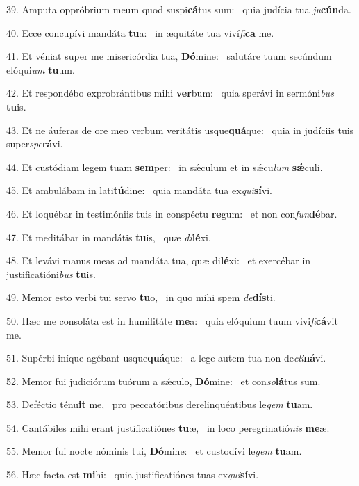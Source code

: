 39. Amputa oppróbrium meum quod suspi\textbf{cá}tus sum: \ast\  quia judícia tua \textit{ju}\textbf{cún}da.\

40. Ecce concupívi mandáta \textbf{tu}a: \ast\  in æquitáte tua viví\textit{fi}\textbf{ca} me.\

41. Et véniat super me misericórdia tua, \textbf{Dó}mine: \ast\  salutáre tuum secúndum elóqui\textit{um} \textbf{tu}um.\

42. Et respondébo exprobrántibus mihi \textbf{ver}bum: \ast\  quia sperávi in sermóni\textit{bus} \textbf{tu}is.\

43. Et ne áuferas de ore meo verbum veritátis usque\textbf{quá}que: \ast\  quia in judíciis tuis super\textit{spe}\textbf{rá}vi.\

44. Et custódiam legem tuam \textbf{sem}per: \ast\  in sǽculum et in sǽcu\textit{lum} \textbf{sǽ}culi.\

45. Et ambulábam in lati\textbf{tú}dine: \ast\  quia mandáta tua ex\textit{qui}\textbf{sí}vi.\

46. Et loquébar in testimóniis tuis in conspéctu \textbf{re}gum: \ast\  et non con\textit{fun}\textbf{dé}bar.\

47. Et meditábar in mandátis \textbf{tu}is, \ast\  quæ \textit{di}\textbf{lé}xi.\

48. Et levávi manus meas ad mandáta tua, quæ di\textbf{lé}xi: \ast\  et exercébar in justificatióni\textit{bus} \textbf{tu}is.\

49. Memor esto verbi tui servo \textbf{tu}o, \ast\  in quo mihi spem \textit{de}\textbf{dís}ti.\

50. Hæc me consoláta est in humilitáte \textbf{me}a: \ast\  quia elóquium tuum vivi\textit{fi}\textbf{cá}vit me.\

51. Supérbi iníque agébant usque\textbf{quá}que: \ast\  a lege autem tua non de\textit{cli}\textbf{ná}vi.\

52. Memor fui judiciórum tuórum a sǽculo, \textbf{Dó}mine: \ast\  et con\textit{so}\textbf{lá}tus sum.\

53. Deféctio ténu\textbf{it} me, \ast\  pro peccatóribus derelinquéntibus le\textit{gem} \textbf{tu}am.\

54. Cantábiles mihi erant justificatiónes \textbf{tu}æ, \ast\  in loco peregrinatió\textit{nis} \textbf{me}æ.\

55. Memor fui nocte nóminis tui, \textbf{Dó}mine: \ast\  et custodívi le\textit{gem} \textbf{tu}am.\

56. Hæc facta est \textbf{mi}hi: \ast\  quia justificatiónes tuas ex\textit{qui}\textbf{sí}vi.\

